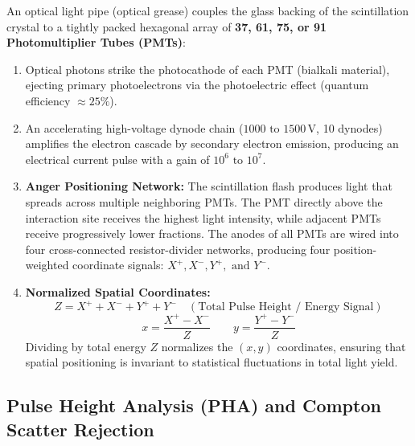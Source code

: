 \documentclass[11pt,a4paper]{article}
\begin{document}
An optical light pipe (optical grease) couples the glass backing of the scintillation crystal to a tightly packed hexagonal array of \textbf{37, 61, 75, or 91 Photomultiplier Tubes (PMTs)}:
\begin{enumerate}[leftmargin=*]
    \item Optical photons strike the photocathode of each PMT (bialkali material), ejecting primary photoelectrons via the photoelectric effect (quantum efficiency $\approx 25\%$).
    \item An accelerating high-voltage dynode chain ($1000\text{ to }1500\,\text{V}$, 10 dynodes) amplifies the electron cascade by secondary electron emission, producing an electrical current pulse with a gain of $10^6\text{ to }10^7$.
    \item \textbf{Anger Positioning Network:} The scintillation flash produces light that spreads across multiple neighboring PMTs. The PMT directly above the interaction site receives the highest light intensity, while adjacent PMTs receive progressively lower fractions. The anodes of all PMTs are wired into four cross-connected resistor-divider networks, producing four position-weighted coordinate signals: $X^+, X^-, Y^+,\text{ and }Y^-$.
    \item \textbf{Normalized Spatial Coordinates:}
    \begin{equation}
        Z = X^+ + X^- + Y^+ + Y^- \quad (\text{Total Pulse Height / Energy Signal})
    \end{equation}
    \begin{equation}
        x = \frac{X^+ - X^-}{Z} \qquad y = \frac{Y^+ - Y^-}{Z}
    \end{equation}
    Dividing by total energy $Z$ normalizes the $(x,y)$ coordinates, ensuring that spatial positioning is invariant to statistical fluctuations in total light yield.
\end{enumerate}

\subsection{Pulse Height Analysis (PHA) and Compton Scatter Rejection}
\end{document}
